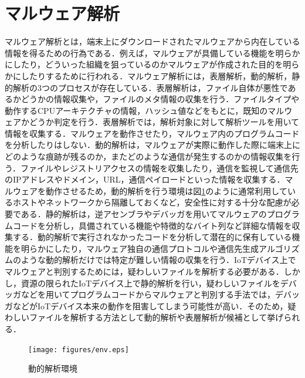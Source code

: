 \section{マルウェア解析}
マルウェア解析とは，端末上にダウンロードされたマルウェアから内在している情報を得るための行為である．例えば，マルウェアが具備している機能を明らかにしたり，どういった組織を狙っているのかマルウェアが作成された目的を明らかにしたりするために行われる．マルウェア解析には，表層解析，動的解析，静的解析の3つのプロセスが存在している\cite{実践}．表層解析は，ファイル自体が悪性であるかどうかの情報収集や，ファイルのメタ情報の収集を行う．ファイルタイプや動作するCPUアーキテクチャの情報，ハッシュ値などをもとに，既知のマルウェアかどうか判定を行う．表層解析では，解析対象に対して解析ツールを用いて情報を収集する．マルウェアを動作させたり，マルウェア内のプログラムコードを分析したりはしない．動的解析は，マルウェアが実際に動作した際に端末上にどのような痕跡が残るのか，またどのような通信が発生するのかの情報収集を行う．ファイルやレジストリアクセスの情報を収集したり，通信を監視して通信先のIPアドレスやドメイン，URL，通信ペイロードといった情報を収集する．マルウェアを動作させるため，動的解析を行う環境は図\ref{fig:env}のように通常利用しているホストやネットワークから隔離しておくなど，安全性に対する十分な配慮が必要である．静的解析は，逆アセンブラやデバッガを用いてマルウェアのプログラムコードを分析し，具備されている機能や特徴的なバイト列など詳細な情報を収集する．動的解析で実行されなかったコードを分析して潜在的に保有している機能を明らかにしたり，マルウェア独自の通信プロトコルや通信先生成アルゴリズムのような動的解析だけでは特定が難しい情報の収集を行う．IoTデバイス上でマルウェアと判別するためには，疑わしいファイルを解析する必要がある．しかし，資源の限られたIoTデバイス上で静的解析を行い，疑わしいファイルをデバッガなどを用いてプログラムコードからマルウェアと判別する手法では，デバッガなどがIoTデバイス本来の動作を阻害してしまう可能性が高い．そのため，疑わしいファイルを解析する方法として動的解析や表層解析が候補として挙げられる．

\newpage

\begin{figure}[h]
   \centering
      \texttt{[image: figures/env.eps]}
      \caption{動的解析環境}
   \label{fig:env}   
\end{figure}

